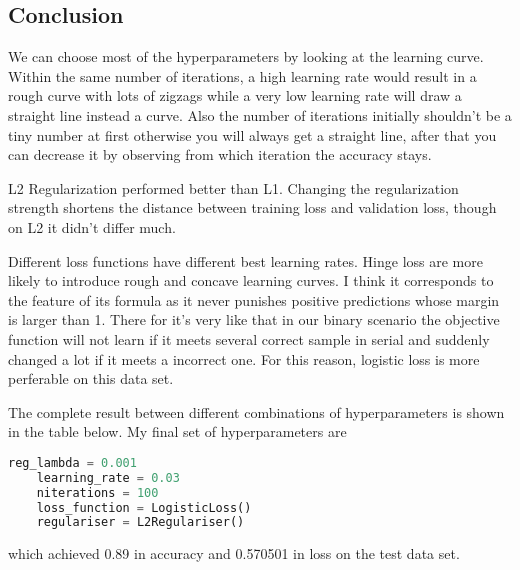 \documentclass[11pt]{article} %
\begin{document}
\subsection{Conclusion}

We can choose most of the hyperparameters by looking at the learning curve. Within the same number of iterations, a high learning rate would result in a rough curve with lots of zigzags while a very low learning rate will draw a straight line instead a curve. Also the number of iterations initially shouldn't be a tiny number at first otherwise you will always get a straight line, after that you can decrease it by observing from which iteration the accuracy stays.

L2 Regularization performed better than L1. Changing the regularization strength shortens the distance between training loss and validation loss, though on L2 it didn't differ much. 

Different loss functions have different best learning rates. Hinge loss are more likely to introduce rough and concave learning curves. I think it corresponds to the feature of its formula as it never punishes positive predictions whose margin is larger than 1. There for it's very like that in our binary scenario the objective function will not learn if it meets several correct sample in serial and suddenly changed a lot if it meets a incorrect one.
For this reason, logistic loss is more perferable on this data set.

The complete result between different combinations of hyperparameters is shown in the table below. My final set of hyperparameters are
\begin{lstlisting}[language=Python]
    reg_lambda = 0.001
    learning_rate = 0.03
    niterations = 100
    loss_function = LogisticLoss()
    regulariser = L2Regulariser()
\end{lstlisting}
which achieved 0.89 in accuracy and 0.570501 in loss on the test data set.
\end{document}
